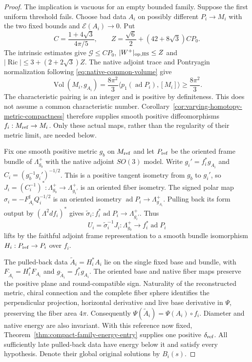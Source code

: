 \documentclass[11pt]{article}
\numberwithin{equation}{section}
\theoremstyle{definition}
\theoremstyle{remark}
\DeclareMathOperator{\Ric}{Ric}
\DeclareMathOperator{\Vol}{Vol}
\begin{document}
\begin{proof}
The implication is vacuous for an empty bounded family.
Suppose the first uniform threshold fails. Choose bad data
$A_i$ on possibly different $P_i\to M_i$ with the two fixed
bounds and $\mathscr E(A_i)\to0$. Put
\[
 C=\frac{1+4\sqrt3}{4\pi/5},\qquad
 Z=\frac{\sqrt6}{2}+(42+8\sqrt3)CP_0.
\]
The intrinsic estimates give $\mathcal G\le CP_0$,
$|W^+|_{\rm op,HS}\le Z$ and
$|\Ric|\le3+(2+2\sqrt3)Z$. The native adjoint trace and
Pontryagin normalization following \eqref{eq:native-common-volume} give
\[
 \Vol(M_i,g_{A_i})=\frac{8\pi^2}{3}
       \langle p_1(\operatorname{ad}P_i),[M_i]\rangle
                \ge\frac{8\pi^2}{3}.
\]
The characteristic pairing is an integer and is positive by
definiteness. This does not assume a common characteristic
number. Corollary~\ref{cor:varying-homotopy-metric-compactness}
therefore supplies smooth positive diffeomorphisms
$f_i:M_{\rm ref}\to M_i$. Only these actual maps, rather
than the regularity of their metric limit, are needed below.

Fix one smooth positive metric $g_b$ on $M_{\rm ref}$ and
let $P_{\rm ref}$ be the oriented frame bundle of
$\Lambda^+_{g_b}$ with the native adjoint $SO(3)$ model.
Write $g_i'=f_i^*g_{A_i}$ and
$C_i=(g_b^{-1}g_i')^{-1/2}$. This is a positive tangent
isometry from $g_b$ to $g_i'$, so
$J_i=(C_i^{-1})^*:\Lambda^+_{g_b}\to\Lambda^+_{g_i'}$
is an oriented fiber isometry. The signed polar map
$\sigma_i=-F_{A_i}^{\sharp}Q_i^{-1/2}$ is an oriented
isometry $\operatorname{ad}P_i\to\Lambda^+_{g_{A_i}}$.
Pulling back its form output by $(\Lambda^2df_i)^*$ gives
$\widetilde\sigma_i:f_i^*\operatorname{ad}P_i
\to\Lambda^+_{g_i'}$. Thus
\[
 U_i=\widetilde\sigma_i^{-1}J_i:
       \Lambda^+_{g_b}\longrightarrow f_i^*\operatorname{ad}P_i
\]
lifts by the faithful adjoint frame representation to a smooth
bundle isomorphism $H_i:P_{\rm ref}\to P_i$ over $f_i$.

The pulled-back data $\widetilde A_i=H_i^*A_i$ lie on the
single fixed base and bundle, with
$F_{\widetilde A_i}=H_i^*F_{A_i}$ and
$g_{\widetilde A_i}=f_i^*g_{A_i}$. The oriented base and native
fiber maps preserve the positive plane and round-compatible sign.
Naturality of the reconstructed
metric, chiral connection and the complete fiber sphere
identifies the perpendicular projection, horizontal derivative
and live base derivative in $\Psi$, preserving the fiber area
$4\pi$. Consequently $\Psi(\widetilde A_i)=\Psi(A_i)\circ f_i$.
Diameter and native energy are also invariant. With this
reference now fixed, Theorem~\ref{thm:compact-family-energy-entry}
supplies one positive $\delta_{\rm ref}$. All sufficiently
late pulled-back data have energy below it and satisfy every
hypothesis. Denote their global original solutions by $B_i(s)$.


\end{proof}
\end{document}
